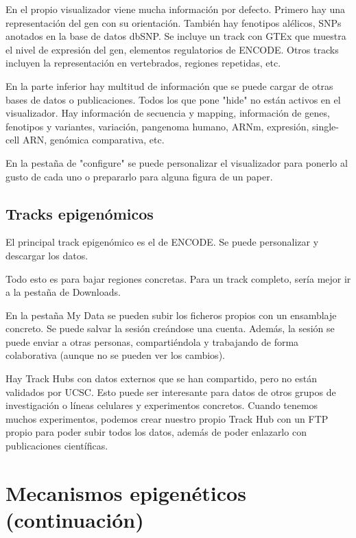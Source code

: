 En el propio visualizador viene mucha información por defecto. Primero hay una representación del gen con su orientación. También hay fenotipos alélicos, SNPs anotados en la base de datos dbSNP. Se incluye un track con GTEx que muestra el nivel de expresión del gen, elementos regulatorios de ENCODE. Otros tracks incluyen la representación en vertebrados, regiones repetidas, etc. 

En la parte inferior hay multitud de información que se puede cargar de otras bases de datos o publicaciones. Todos los que pone "hide" no están activos en el visualizador. Hay información de secuencia y mapping, información de genes, fenotipos y variantes, variación, pangenoma humano, ARNm, expresión, single-cell ARN, genómica comparativa, etc. 

En la pestaña de "configure" se puede personalizar el visualizador para ponerlo al gusto de cada uno o prepararlo para alguna figura de un paper.

\subsection{Tracks epigenómicos}
El principal track epigenómico es el de ENCODE. Se puede personalizar y descargar los datos. 

Todo esto es para bajar regiones concretas. Para un track completo, sería mejor ir a la pestaña de Downloads.

En la pestaña My Data se pueden subir los ficheros propios con un ensamblaje concreto. Se puede salvar la sesión creándose una cuenta.
Además, la sesión se puede enviar a otras personas, compartiéndola y trabajando de forma colaborativa (aunque no se pueden ver los cambios).

Hay Track Hubs con datos externos que se han compartido, pero no están validados por UCSC. Esto puede ser interesante para datos de otros grupos de investigación o líneas celulares y experimentos concretos. Cuando tenemos muchos experimentos, podemos crear nuestro propio Track Hub con un FTP propio para poder subir todos los datos, además de poder enlazarlo con publicaciones científicas.


\section{Mecanismos epigenéticos (continuación)}
